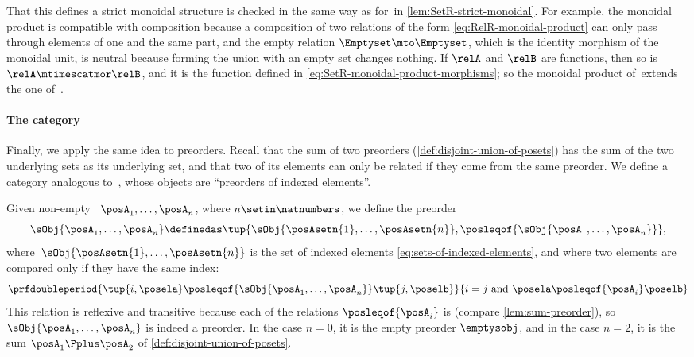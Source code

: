 That this defines a strict monoidal structure is checked in the same way as for~\SetR in \cref{lem:SetR-strict-monoidal}.
For example, the monoidal product is compatible with composition because a composition of two relations of the form \cref{eq:RelR-monoidal-product} can only pass through elements of one and the same part, and the empty relation $\Emptyset \mto \Emptyset$, which is the identity morphism of the monoidal unit, is neutral because forming the union with an empty set changes nothing.
If $\relA$ and $\relB$ are functions, then so is $\relA \mtimescatmor \relB$, and it is the function defined in \cref{eq:SetR-monoidal-product-morphisms}; so the monoidal product of~\RelR extends the one of~\SetR.

\paragraph{The category~\PreR}
\label{sec:PreR}

Finally, we apply the same idea to preorders.
Recall that the sum of two preorders (\cref{def:disjoint-union-of-posets}) has the sum of the two underlying sets as its underlying set, and that two of its elements can only be related if they come from the same preorder.
We define a category analogous to~\SetR, whose objects are ``preorders of indexed elements''.

Given non-empty ~$\posA_1,\ldots, \posA_n$, where $n \setin \natnumbers$, we define the preorder
\begin{equation}
    \label{eq:preorderofindexedelements}
    \sObj{\posA_1,\ldots, \posA_n}\definedas \tup{\sObj{\posAsetn{1},\ldots, \posAsetn{n}}, \posleqof{\sObj{\posA_1,\ldots, \posA_n}}},
\end{equation}
where~$\sObj{\posAsetn{1},\ldots, \posAsetn{n}}$ is the set of indexed elements \cref{eq:sets-of-indexed-elements}, and where two elements are compared only if they have the same index:
\begin{equation}
    \label{eq:indexed-preorder-order}
    \prfdoubleperiod{
        \tup{i, \posela}
        \posleqof{\sObj{\posA_1,\ldots, \posA_n}}
        \tup{j, \poselb}
    }{
        i = j \text{ and } \posela \posleqof{\posA_i} \poselb
    }
\end{equation}
This relation is reflexive and transitive because each of the relations $\posleqof{\posA_i}$ is (compare \cref{lem:sum-preorder}), so $\sObj{\posA_1,\ldots, \posA_n}$ is indeed a preorder.
In the case $n = 0$, it is the empty preorder $\emptysobj$, and in the case $n = 2$, it is the sum $\posA_1 \Pplus \posA_2$ of \cref{def:disjoint-union-of-posets}.


